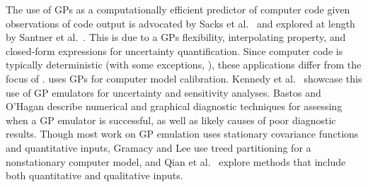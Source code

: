 \documentclass[twocolumn,10pt]{asme2ej}
\begin{document}
%
%
%

%

%
The use of GPs as a computationally efficient predictor of computer code given observations of code output is advocated by Sacks et al.\ \cite{Sacks1989} and explored at length by Santner et al.\ \cite{Santner2003a}. This is due to a GPs flexibility, interpolating property, and closed-form expressions for uncertainty quantification.
%
Since computer code is typically deterministic (with some exceptions, \cite{Pratola2018}), these applications differ from the focus of \cite{OHagan1978}. 
%
\cite{Kennedy2001} uses GPs for computer model calibration. 
%
Kennedy et al.\ \cite{Kennedy2006} showcase this use of GP emulators for uncertainty and sensitivity analyses. 
%
Bastos and O'Hagan \cite{Bastos2009} describe numerical and graphical diagnostic techniques for assessing when a GP emulator is successful, as well as likely causes of poor diagnostic results. 
%
Though most work on GP emulation uses stationary covariance functions 
and quantitative inputs, 
%
Gramacy and Lee \cite{Gramacy2008} use treed partitioning for a nonstationary computer model, and
%
Qian et al.\ \cite{Qian2008} explore methods that include both quantitative and qualitative inputs.
%
\end{document}

